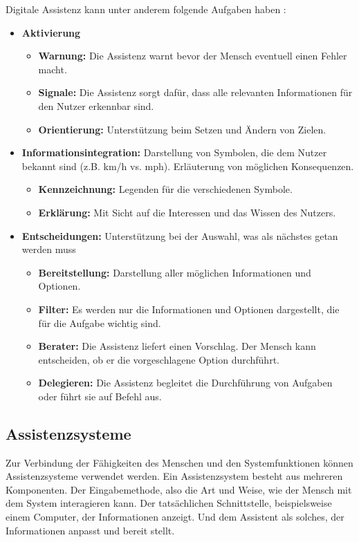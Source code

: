 Digitale Assistenz kann unter anderem folgende Aufgaben haben \cite{Wandke2005}:
\begin{itemize}
\item \textbf{Aktivierung}
	\begin{itemize}
	\item \textbf{Warnung:} Die Assistenz warnt bevor der Mensch eventuell einen Fehler macht.
	\item \textbf{Signale:} Die Assistenz sorgt dafür, dass alle relevanten Informationen für den Nutzer erkennbar sind.
	\item \textbf{Orientierung:} Unterstützung beim Setzen und Ändern von Zielen.
	\end{itemize}
\item \textbf{Informationsintegration:} Darstellung von Symbolen, die dem Nutzer bekannt sind (z.B. km/h vs. mph). Erläuterung von möglichen Konsequenzen.
	\begin{itemize}
	\item \textbf{Kennzeichnung:} Legenden für die verschiedenen Symbole.
	\item \textbf{Erklärung:} Mit Sicht auf die Interessen und das Wissen des Nutzers.
	\end{itemize}
\item \textbf{Entscheidungen:} Unterstützung bei der Auswahl, was als nächstes getan werden muss
	\begin{itemize}
	\item \textbf{Bereitstellung:} Darstellung aller möglichen Informationen und Optionen.
	\item \textbf{Filter:} Es werden nur die Informationen und Optionen dargestellt, die für die Aufgabe wichtig sind.
	\item \textbf{Berater:} Die Assistenz liefert einen Vorschlag. Der Mensch kann entscheiden, ob er die vorgeschlagene Option durchführt.
	\item \textbf{Delegieren:} Die Assistenz begleitet die Durchführung von Aufgaben oder führt sie auf Befehl aus.
	\end{itemize}
\end{itemize}

\subsection{Assistenzsysteme}
\label{2:Assistenzsysteme}
Zur Verbindung der Fähigkeiten des Menschen und den Systemfunktionen können Assistenzsysteme verwendet werden. Ein Assistenzsystem besteht aus mehreren Komponenten. Der Eingabemethode, also die Art und Weise, wie der Mensch mit dem System interagieren kann. Der tatsächlichen Schnittstelle, beispielsweise einem Computer, der Informationen anzeigt. Und dem Assistent als solches, der Informationen anpasst und bereit stellt.

